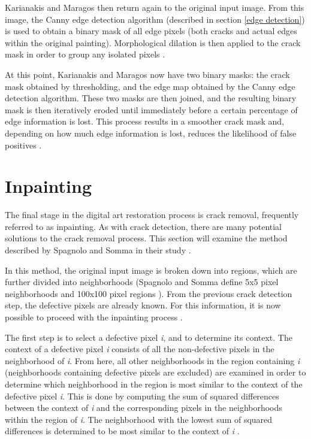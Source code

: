 \documentclass{sig-alternate}
\begin{document}
Karianakis and Maragos then return again to the original input image. From this image, the Canny edge detection algorithm (described in section \ref{edge detection}) is used to obtain a binary mask of all edge pixels (both cracks and actual edges within the original painting). Morphological dilation is then applied to the crack mask in order to group any isolated pixels \cite{Theran:2013}.

At this point, Karianakis and Maragos now have two binary masks: the crack mask obtained by thresholding, and the edge map obtained by the Canny edge detection algorithm. These two masks are then joined, and the resulting binary mask is then iteratively eroded until immediately before a certain percentage of edge information is lost. This process results in a smoother crack mask and, depending on how much edge information is lost, reduces the likelihood of false positives \cite{Theran:2013}.

\section{Inpainting}\label{inpainting}
The final stage in the digital art restoration process is crack removal, frequently referred to as inpainting. As with crack detection, there are many potential solutions to the crack removal process. This section will examine the method described by Spagnolo and Somma in their study \cite{TopHat:2010}.

In this method, the original input image is broken down into regions, which are further divided into neighborhoods (Spagnolo and Somma define 5x5 pixel neighborhoods and 100x100 pixel regions \cite{TopHat:2010}). From the previous crack detection step, the defective pixels are already known. For this information, it is now possible to proceed with the inpainting process \cite{TopHat:2010}.

The first step is to select a defective pixel \textit{i}, and to determine its context. The context of a defective pixel \textit{i} consists of all the non-defective pixels in the neighborhood of \textit{i}. From here, all other neighborhoods in the region containing \textit{i} (neighborhoods containing defective pixels are excluded) are examined in order to determine which neighborhood in the region is most similar to the context of the defective pixel \textit{i}. This is done by computing the sum of squared differences between the context of \textit{i} and the corresponding pixels in the neighborhoods within the region of \textit{i}. The neighborhood with the lowest sum of squared differences is determined to be most similar to the context of \textit{i} \cite{TopHat:2010}.
\end{document}
